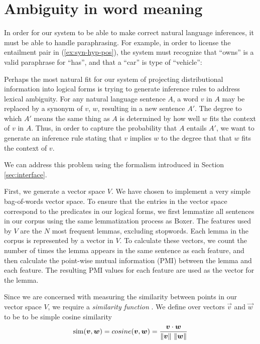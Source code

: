 \section{Ambiguity in word meaning}

In order for our system to be able to make correct natural language inferences,
it must be able to handle paraphrasing.  For example, in order to license the
entailment pair in (\ref{ex:syn-hyp-pos}), the system must recognize that
``owns'' is a valid paraphrase for ``has'', and that a ``car'' is type of
``vehicle'':


Perhaps the most natural fit for our system of projecting distributional
information into logical forms is trying to generate inference rules to address
lexical ambiguity.  For any natural language sentence $A$, a word $v$ in $A$ may
be replaced by a synonym of $v$, $w$, resulting in a new sentence $A'$.  The
degree to which $A'$ means the same thing as $A$ is determined by how well $w$
fits the context of $v$ in $A$.  Thus, in order to capture the probability that
$A$ entails $A'$, we want to generate an inference rule stating that $v$ implies
$w$ to the degree that that $w$ fits the context of $v$.

We can address this problem using the formalism introduced in
Section \ref{sec:interface}.

First, we generate a vector space $V$.  We have chosen to implement a very
simple bag-of-words vector space.  To ensure that the entries in the vector
space correspond to the predicates in our logical forms, we first lemmatize all
sentences in our corpus using the same lemmatization process as Boxer.
The features used by $V$ are the $N$ most frequent lemmas, excluding stopwords.  
Each lemma in the corpus is represented by a vector in $V$.  To calculate these
vectors, we count the number of times the lemma appears in the same sentence
as each feature, and then calculate the point-wise mutual information (PMI)
between the lemma and each feature.  The resulting PMI values for each feature
are used as the vector for the lemma.

Since we are concerned with measuring the similarity between points in our
vector space $V$, we require a {\it similarity function} \simfunc.  We define
\simfunc over vectors $\vec v$ and $\vec w$ to be to be simple cosine similarity
\[ \simfunc(\vec v, \vec w) = cosine(\vec v, \vec w) = \frac{\vec v \cdot \vec
w}{\|\vec v\|~\|\vec w\|}\]

